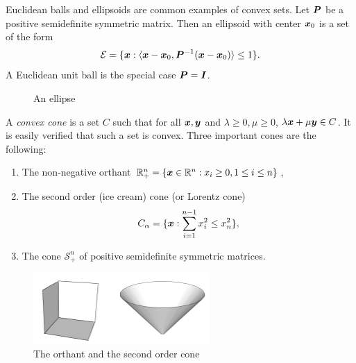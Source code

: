 \begin{example}
 Euclidean balls and ellipsoids are common examples of convex sets. Let $\bm{P}$ be a positive semidefinite symmetric matrix. Then an ellipsoid with center $\bm{x}_0$ is a set of the form
 \begin{equation*}
  \mathcal{E} = \{\bm{x} \mathrel{\mathop{:}} \langle {\bm{x}-\bm{x}_0}, {\bm{P}^{-1}(\bm{x}-\bm{x}_0)} \rangle\leq 1\}.
 \end{equation*}
A Euclidean unit ball is the special case $\bm{P}=\bm{I}$.
\begin{figure}[h!]
\centering
{}
\caption{An ellipse}
\end{figure}
\end{example}

\begin{example}
 A {\em convex cone} is a set $C$ such that for all $\bm{x},\bm{y}$ and $\lambda\geq 0, \mu\geq 0$,
 $\lambda \bm{x}+\mu \bm{y}\in C$. It is easily verified that such a set is convex. Three important cones are the following:
 \begin{enumerate}
  \item The non-negative orthant $\mathbb{R}^n_{+}=\{\bm{x}\in \mathbb{R}^n \mathrel{\mathop{:}} x_i\geq 0, 1\leq i\leq n\}$,
  \item The second order (ice cream) cone (or Lorentz cone)
  \begin{equation*}
   C_{\alpha} = \{\bm{x} \mathrel{\mathop{:}} \sum_{i=1}^{n-1}x_i^2\leq x_n^2\},
  \end{equation*}
  \item The cone $\mathcal{S}_{+}^n$ of positive semidefinite symmetric matrices.
 \end{enumerate}
\begin{figure}[h!]
\centering
 \includegraphics[width=0.6\textwidth]{images/cones.png}
 \caption{The orthant and the second order cone}
\end{figure}

\end{example}


